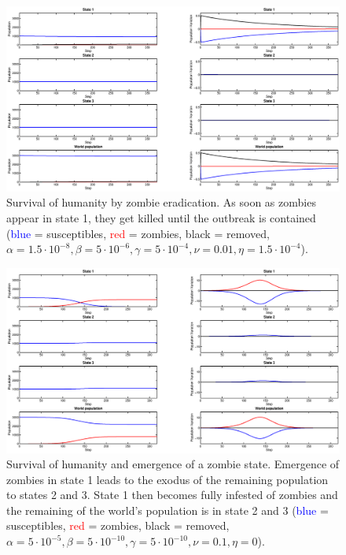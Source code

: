 \documentclass[11pt]{article} %
\begin{document}
\begin{figure}[h!]
\centerline{
\includegraphics[scale=0.35]{../images/Matlab_figures/example_zkill.eps}}
\caption{Survival of humanity by zombie eradication. As soon as zombies appear in state 1, they get killed until the outbreak is contained  (\textcolor{blue}{blue} = susceptibles, \textcolor{red}{red} = zombies, black = removed, $\alpha=1.5\cdot10^{-8}, \beta=5\cdot10^{-6}, \gamma=5\cdot10^{-4}, \nu=0.01, \eta=1.5\cdot10^{-4}$).
\label{skill} }
\end{figure}

\begin{figure}[h!]
\centerline{
\includegraphics[scale=0.35]{../images/Matlab_figures/example_exode.eps}}
\caption{Survival of humanity and emergence of a zombie state. Emergence of zombies in state 1 leads to the exodus of the remaining population to states 2 and 3. State 1 then becomes fully infested of zombies and the remaining of the world's population is in state 2 and 3 (\textcolor{blue}{blue} = susceptibles, \textcolor{red}{red} = zombies, black = removed, $\alpha=5\cdot10^{-5},  \beta=5\cdot10^{-10},  \gamma=5\cdot10^{-10},  \nu=0.1,  \eta=0$). \label{exodus} }
\end{figure}
\end{document}
